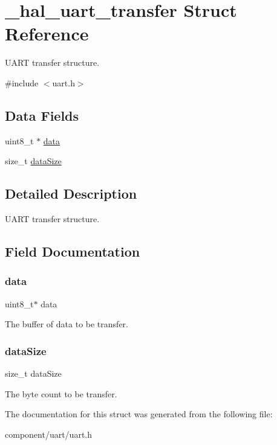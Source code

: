\hypertarget{struct__hal__uart__transfer}{}\section{\+\_\+hal\+\_\+uart\+\_\+transfer Struct Reference}
\label{struct__hal__uart__transfer}


U\+A\+RT transfer structure.  




{\ttfamily \#include $<$uart.\+h$>$}

\subsection*{Data Fields}
\begin{DoxyCompactItemize}
\item 
uint8\+\_\+t $\ast$ \mbox{\hyperlink{struct__hal__uart__transfer_abe222f6d3581e7920dcad5306cc906a8}{data}}
\item 
size\+\_\+t \mbox{\hyperlink{struct__hal__uart__transfer_a78f9703861dd365a513c2c5aab9f9239}{data\+Size}}
\end{DoxyCompactItemize}


\subsection{Detailed Description}
U\+A\+RT transfer structure. 

\subsection{Field Documentation}
\mbox{\label{struct__hal__uart__transfer_abe222f6d3581e7920dcad5306cc906a8}} 
\subsubsection{\texorpdfstring{data}{data}}
{\footnotesize\ttfamily uint8\+\_\+t$\ast$ data}

The buffer of data to be transfer. \mbox{\label{struct__hal__uart__transfer_a78f9703861dd365a513c2c5aab9f9239}} 
\subsubsection{\texorpdfstring{dataSize}{dataSize}}
{\footnotesize\ttfamily size\+\_\+t data\+Size}

The byte count to be transfer. 

The documentation for this struct was generated from the following file\+:\begin{DoxyCompactItemize}
\item 
component/uart/uart.\+h\end{DoxyCompactItemize}
